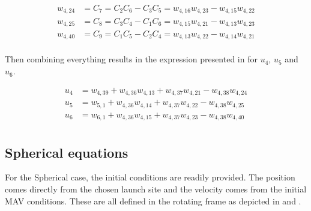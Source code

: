 \begin{equation} \label{eq:kHatAuxF}
\begin{split}
w_{4,24} &= C_{7} = C_{2}C_{6}-C_{3}C_{5} = w_{4,16}w_{4,23}-w_{4,15}w_{4,22} \\
w_{4,25} &= C_{8} = C_{3}C_{4}-C_{1}C_{6} = w_{4,15}w_{4,21}-w_{4,13}w_{4,23}\\
w_{4,40} &= C_{9} = C_{1}C_{5}-C_{2}C_{4} = w_{4,13}w_{4,22}-w_{4,14}w_{4,21}\\
\end{split}
\end{equation}

Then combining everything results in the expression presented in  for $u_{4}$, $u_{5}$ and $u_{6}$.

\begin{equation} \label{eq:finalAccAuxF}
\begin{split}
u_{4} &= w_{4,39}+w_{4,36}w_{4,13}+w_{4,37}w_{4,21}-w_{4,38}w_{4,24} \\
u_{5} &= w_{5,1}+w_{4,36}w_{4,14}+w_{4,37}w_{4,22}-w_{4,38}w_{4,25} \\
u_{6} &= w_{6,1}+w_{4,36}w_{4,15}+w_{4,37}w_{4,23}-w_{4,38}w_{4,40} \\
\end{split}
\end{equation}
















\subsection{Spherical equations}
\label{subsec:sphereq}
For the Spherical case, the initial conditions are readily provided. The position comes directly from the chosen launch site and the velocity comes from the initial \ac{MAV} conditions. These are all defined in the rotating frame as depicted in  and .

